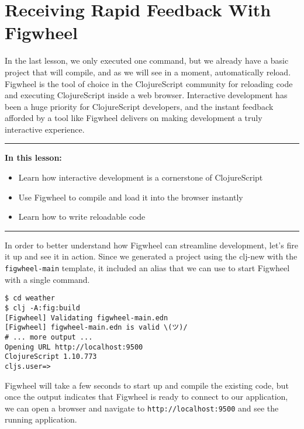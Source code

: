 \documentclass[10pt,twoside,openright]{memoir}
\begin{document}
\chapter{Receiving Rapid Feedback With Figwheel}

In the last lesson, we only executed one command, but we already have a
basic project that will compile, and as we will see in a moment,
automatically reload. Figwheel is the tool of choice in the
ClojureScript community for reloading code and executing ClojureScript
inside a web browser. Interactive development has been a huge priority
for ClojureScript developers, and the instant feedback afforded by a
tool like Figwheel delivers on making development a truly interactive
experience.

\begin{center}\rule{0.5\linewidth}{0.5pt}\end{center}

\textbf{In this lesson:}

\begin{itemize}
\tightlist
\item
  Learn how interactive development is a cornerstone of ClojureScript
\item
  Use Figwheel to compile and load it into the browser instantly
\item
  Learn how to write reloadable code
\end{itemize}

\begin{center}\rule{0.5\linewidth}{0.5pt}\end{center}

In order to better understand how Figwheel can streamline development,
let's fire it up and see it in action. Since we generated a project
using the clj-new with the \texttt{figwheel-main} template, it included
an alias that we can use to start Figwheel with a single command.

\begin{verbatim}
$ cd weather
$ clj -A:fig:build
[Figwheel] Validating figwheel-main.edn
[Figwheel] figwheel-main.edn is valid \(ツ)/
# ... more output ...
Opening URL http://localhost:9500
ClojureScript 1.10.773
cljs.user=>
\end{verbatim}

Figwheel will take a few seconds to start up and compile the existing
code, but once the output indicates that Figwheel is ready to connect to
our application, we can open a browser and navigate to
\texttt{http://localhost:9500} and see the running application.
\end{document}
